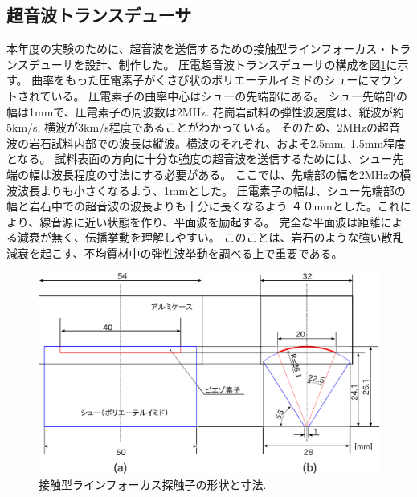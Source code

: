 \subsection{超音波トランスデューサ}
本年度の実験のために、超音波を送信するための接触型ラインフォーカス・トランスデューサを設計、制作した。
圧電超音波トランスデューサの構成を図\ref{fig:fig2}に示す。
曲率をもった圧電素子がくさび状のポリエーテルイミドのシューにマウントされている。
圧電素子の曲率中心はシューの先端部にある。
シュー先端部の幅は1mmで、圧電素子の周波数は2MHz.
花崗岩試料の弾性波速度は、縦波が約5km/s, 横波が3km/s程度であることがわかっている。
そのため、2MHzの超音波の岩石試料内部での波長は縦波。横波のそれぞれ、およそ2.5mm, 1.5mm程度となる。
試料表面の方向に十分な強度の超音波を送信するためには、シュー先端の幅は波長程度の寸法にする必要がある。
ここでは、先端部の幅を2MHzの横波波長よりも小さくなるよう、1mmとした。
圧電素子の幅は、シュー先端部の幅と岩石中での超音波の波長よりも十分に長くなるよう
４０mmとした。これにより、線音源に近い状態を作り、平面波を励起する。
完全な平面波は距離による減衰が無く、伝播挙動を理解しやすい。
このことは、岩石のような強い散乱減衰を起こす、不均質材中の弾性波挙動を調べる上で重要である。
\begin{figure}[h]
	\begin{center}
	\includegraphics[width=0.8\linewidth]{Figs/fig2.eps} 
	\end{center}
	\caption{
		接触型ラインフォーカス探触子の形状と寸法.
	} 
	\label{fig:fig2}
\end{figure}
